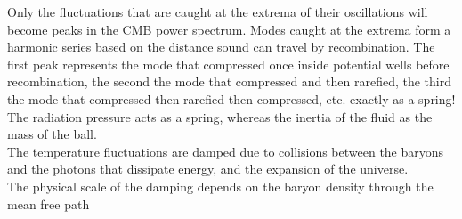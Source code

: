 \documentclass{article}
\begin{document}
Only the fluctuations that are caught at the extrema of their oscillations will become peaks in the CMB power spectrum.
Modes caught at the extrema form a harmonic series based on the distance sound can travel by recombination.
The first peak represents the mode that compressed once inside potential wells before recombination, the second the mode that compressed and then rarefied, the third the mode that compressed then rarefied then compressed, etc. exactly as a spring!
The radiation pressure acts as a spring, whereas the inertia of the fluid as the mass of the ball.\\
The temperature fluctuations are damped due to collisions between the baryons and the photons that dissipate energy, and the expansion of the universe.\\
The physical scale of the damping depends on the baryon density through the mean free path
\end{document}

